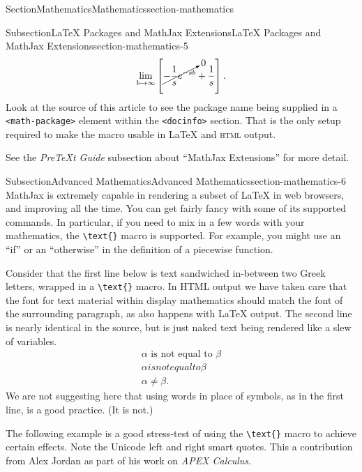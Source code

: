 \documentclass[twoside,10pt,]{article}
\newcommand{\mono}[1]{\texttt{#1}}
\newcommand{\initialism}[1]{\textsc{\MakeLowercase{#1}}}
\newcommand{\pubtitle}[1]{\textsl{#1}}
\numberwithin{equation}{section}
\begin{document}
\begin{sectionptx}{Section}{Mathematics}{}{Mathematics}{}{}{section-mathematics}
\begin{subsectionptx}{Subsection}{\LaTeX{} Packages and MathJax Extensions}{}{\LaTeX{} Packages and MathJax Extensions}{}{}{section-mathematics-5}
\begin{equation*}
\lim_{b \rightarrow \infty}\left[\cancelto{0}{-\frac{1}{s}e^{-sb}} + \frac{1}{s}\right]\text{.}
\end{equation*}
Look at the source of this article to see the package name being supplied in a \mono{<math-package>} element within the \mono{<docinfo>} section.  That is the only setup required to make the macro usable in \LaTeX{} and \initialism{HTML} output.\index{cancelto macro@\mono{cancelto} macro}%
\par
See the \pubtitle{PreTeXt Guide} subsection about \textquotedblleft{}MathJax Extensions\textquotedblright{} for more detail.%
\end{subsectionptx}
%
%
\typeout{************************************************}
\typeout{************************************************}
%
\begin{subsectionptx}{Subsection}{Advanced Mathematics}{}{Advanced Mathematics}{}{}{section-mathematics-6}
MathJax is extremely capable in rendering a subset of \LaTeX{} in web browsers, and improving all the time.  You can get fairly fancy with some of its supported commands.  In particular, if you need to mix in a few words with your mathematics, the \mono{\textbackslash{}text\{\}} macro is supported.  For example, you might use an \textquotedblleft{}if\textquotedblright{} or an \textquotedblleft{}otherwise\textquotedblright{} in the definition of a piecewise function.%
\par
Consider that the first line below is text sandwiched in-between two Greek letters, wrapped in a \mono{\textbackslash{}text\{\}} macro.  In HTML output we have taken care that the font for text material within display mathematics should match the font of the  surrounding paragraph, as also happens with \LaTeX{} output.  The second line is nearly identical in the source, but is just naked text being rendered like a slew of variables.%
\begin{gather*}
\alpha\text{ is not equal to }\beta\\
\alpha is not equal to \beta\\
\alpha\neq\beta\text{.}
\end{gather*}
We are not suggesting here that using words in place of symbols, as in the first line, is a good practice.  (It is not.)%
\par
The following example is a good stress-test of using the \mono{\textbackslash{}text\{\}} macro to achieve certain effects.  Note the Unicode left and right smart quotes.  This a contribution from Alex Jordan as part of his work on \pubtitle{APEX Calculus}.%

\end{subsectionptx}
\end{sectionptx}
\end{document}
